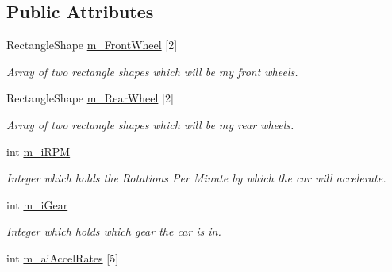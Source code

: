 \subsection*{Public Attributes}
\begin{DoxyCompactItemize}
\item 
\hypertarget{class_car_acd5aa786fc90d6408bfa25da88b3d9db}{}Rectangle\+Shape \hyperlink{class_car_acd5aa786fc90d6408bfa25da88b3d9db}{m\+\_\+\+Front\+Wheel} \mbox{[}2\mbox{]}\label{class_car_acd5aa786fc90d6408bfa25da88b3d9db}

\begin{DoxyCompactList}\small\item\em Array of two rectangle shapes which will be my front wheels. \end{DoxyCompactList}\item 
\hypertarget{class_car_a028cb3de89f07167130322eeaa35d252}{}Rectangle\+Shape \hyperlink{class_car_a028cb3de89f07167130322eeaa35d252}{m\+\_\+\+Rear\+Wheel} \mbox{[}2\mbox{]}\label{class_car_a028cb3de89f07167130322eeaa35d252}

\begin{DoxyCompactList}\small\item\em Array of two rectangle shapes which will be my rear wheels. \end{DoxyCompactList}\item 
\hypertarget{class_car_a4d453c99f080df6d44f0f44eaa5d24e1}{}int \hyperlink{class_car_a4d453c99f080df6d44f0f44eaa5d24e1}{m\+\_\+i\+R\+P\+M}\label{class_car_a4d453c99f080df6d44f0f44eaa5d24e1}

\begin{DoxyCompactList}\small\item\em Integer which holds the Rotations Per Minute by which the car will accelerate. \end{DoxyCompactList}\item 
\hypertarget{class_car_aa05d717a7339d5c9fc6fc420fec7041d}{}int \hyperlink{class_car_aa05d717a7339d5c9fc6fc420fec7041d}{m\+\_\+i\+Gear}\label{class_car_aa05d717a7339d5c9fc6fc420fec7041d}

\begin{DoxyCompactList}\small\item\em Integer which holds which gear the car is in. \end{DoxyCompactList}\item 
\hypertarget{class_car_a42b2cb593b38ebbf22733931740b68cc}{}int \hyperlink{class_car_a42b2cb593b38ebbf22733931740b68cc}{m\+\_\+ai\+Accel\+Rates} \mbox{[}5\mbox{]}\label{class_car_a42b2cb593b38ebbf22733931740b68cc}


\end{DoxyCompactItemize}
